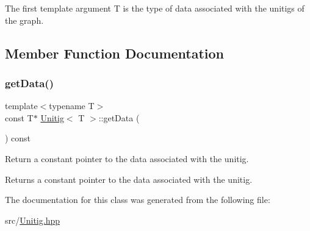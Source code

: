 The first template argument T is the type of data associated with the unitigs of the graph. 

\subsection{Member Function Documentation}
\mbox{\label{classUnitig_a1627a06f59175d5f82646bb75d5484d3}} 
\subsubsection{\texorpdfstring{get\+Data()}{getData()}}
{\footnotesize\ttfamily template$<$typename T$>$ \\
const T$\ast$ \hyperlink{classUnitig}{Unitig}$<$ T $>$\+::get\+Data (\begin{DoxyParamCaption}{ }\end{DoxyParamCaption}) const\hspace{0.3cm}{\ttfamily [inline]}}



Return a constant pointer to the data associated with the unitig. 

\begin{DoxyReturn}{Returns}
a constant pointer to the data associated with the unitig. 
\end{DoxyReturn}


The documentation for this class was generated from the following file\+:\begin{DoxyCompactItemize}
\item 
src/\hyperlink{Unitig_8hpp}{Unitig.\+hpp}\end{DoxyCompactItemize}
